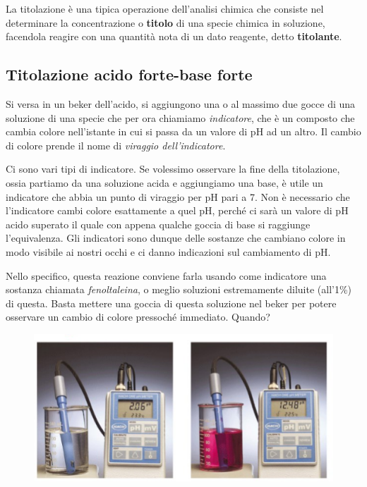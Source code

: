 La titolazione è una tipica operazione dell'analisi chimica che consiste nel determinare la concentrazione o \textbf{titolo} di una specie chimica in soluzione, facendola reagire con una quantità nota di un dato reagente, detto \textbf{titolante}.
\subsection{Titolazione acido forte-base forte}
Si versa in un beker dell'acido, si aggiungono una o al massimo due gocce di una soluzione di una specie che per ora chiamiamo \textit{indicatore}, che è un composto che cambia colore nell'istante in cui si passa da un valore di pH ad un altro. Il cambio di colore prende il nome di \textit{viraggio dell'indicatore}.

Ci sono vari tipi di indicatore. Se volessimo osservare la fine della titolazione, ossia partiamo da una soluzione acida e aggiungiamo una base, è utile un indicatore che abbia un punto di viraggio per pH pari a 7. Non è necessario che l'indicatore cambi colore esattamente a quel pH, perché ci sarà un valore di pH acido superato il quale con appena qualche goccia di base si raggiunge l'equivalenza. Gli indicatori sono dunque delle sostanze che cambiano colore in modo visibile ai nostri occhi e ci danno indicazioni sul cambiamento di pH.

Nello specifico, questa reazione conviene farla usando come indicatore una sostanza chiamata \textit{fenoltaleina}, o meglio soluzioni estremamente diluite (all'1\%) di questa. Basta mettere una goccia di questa soluzione nel beker per potere osservare un cambio di colore pressoché immediato. Quando?

\begin{figure}[H]
    \centering
    \includegraphics[width=14cm]{immagini/Fenoltaleina.png}
\end{figure}


